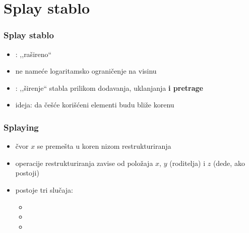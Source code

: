 \documentclass[compress,aspectratio=169]{beamer}
\begin{document}
\section[Splay stablo]{Splay stablo}
\begin{frame}[fragile]
  \frametitle{Splay stablo}
  \begin{itemize}
    \item {}: ,,rašireno`` 
    \item ne nameće logaritamsko ograničenje na visinu
    \item {}: ,,širenje`` stabla prilikom dodavanja, uklanjanja \textbf{i pretrage}
    \item ideja: da češće korišćeni elementi budu bliže korenu
  \end{itemize}
\end{frame}

\begin{frame}[fragile]
  \frametitle{Splaying}
  \begin{itemize}
    \item čvor $x$ se premešta u koren nizom restrukturiranja 
    \item operacije restrukturiranja zavise od položaja $x$, $y$ (roditelja) i $z$ (dede, ako postoji)
    \item postoje tri slučaja:
    \begin{itemize}
      \item {}
      \item {}
      \item {}
    \end{itemize}
  \end{itemize}
\end{frame}
\end{document}
